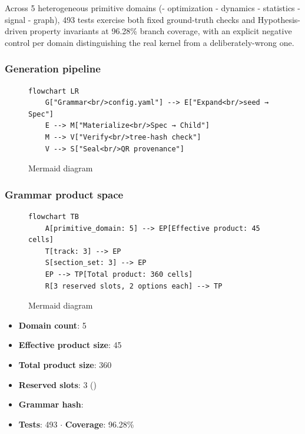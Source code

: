 \documentclass[
]{article}
\providecommand{\tightlist}{%
  \setlength{\itemsep}{0pt}\setlength{\parskip}{0pt}}
\begin{document}
Across 5 heterogeneous primitive domains (- optimization - dynamics -
statistics - signal - graph), 493 tests exercise both fixed ground-truth
checks and Hypothesis-driven property invariants at 96.28\% branch
coverage, with an explicit negative control per domain distinguishing
the real kernel from a deliberately-wrong one.

\subsubsection{Generation pipeline}\label{generation-pipeline}

\begin{figure}[htbp]
\centering
\begin{verbatim}
flowchart LR
    G["Grammar<br/>config.yaml"] --> E["Expand<br/>seed → Spec"]
    E --> M["Materialize<br/>Spec → Child"]
    M --> V["Verify<br/>tree-hash check"]
    V --> S["Seal<br/>QR provenance"]
\end{verbatim}
\caption{Mermaid diagram}
\end{figure}

\subsubsection{Grammar product space}\label{grammar-product-space}

\begin{figure}[htbp]
\centering
\begin{verbatim}
flowchart TB
    A[primitive_domain: 5] --> EP[Effective product: 45 cells]
    T[track: 3] --> EP
    S[section_set: 3] --> EP
    EP --> TP[Total product: 360 cells]
    R[3 reserved slots, 2 options each] --> TP
\end{verbatim}
\caption{Mermaid diagram}
\end{figure}

\begin{itemize}
\tightlist
\item
  \textbf{Domain count}: 5
\item
  \textbf{Effective product size}: 45
\item
  \textbf{Total product size}: 360
\item
  \textbf{Reserved slots}: 3
  ()
\item
  \textbf{Grammar hash}: 
\item
  \textbf{Tests}: 493 \texorpdfstring{\ensuremath{\cdot}}{.} \textbf{Coverage}: 96.28\%
\end{itemize}
\end{document}
